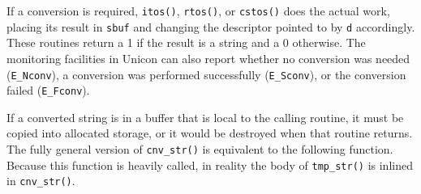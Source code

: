 
If a conversion is required, \texttt{itos()}, \texttt{rtos()}, or
\texttt{cstos()} does the actual work, placing its result in \texttt{sbuf} and
changing the descriptor pointed to by \texttt{d} accordingly. These routines
return a 1 if the result is a string and a 0 otherwise. The monitoring
facilities in Unicon can also report whether no conversion was needed
(\texttt{E\_Nconv}), a conversion was performed successfully
(\texttt{E\_Sconv}), or the conversion failed (\texttt{E\_Fconv}).

If a converted string is in a buffer that is local to the calling
routine, it must be copied into allocated storage, or it would be
destroyed when that routine returns. The fully general version of
\texttt{cnv\_str()} is equivalent to the following function. Because
this function is heavily called, in reality the body of
\texttt{tmp\_str()} is inlined in \texttt{cnv\_str()}.

